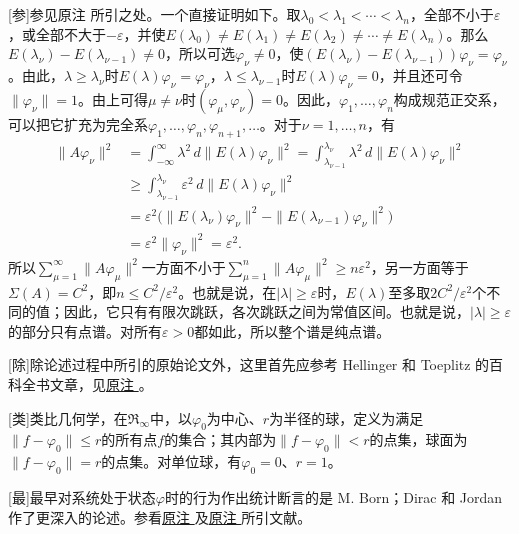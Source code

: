 \documentclass[fontsize=13pt,twoside,openany,headings=normal,parskip=false,bookmarkpackage=false,DIV=calc]{scrbook}
\begin{document}
[参]{参见原注 \hyperlink{note-64}{} 所引之处。一个直接证明如下。取$\lambda_0<\lambda_1<\cdots<\lambda_n$，全部不小于$\varepsilon$，或全部不大于$-\varepsilon$，并使$E(\lambda_0)\ne E(\lambda_1)\ne E(\lambda_2)\ne\cdots\ne E(\lambda_n)$。那么$E(\lambda_\nu)-E(\lambda_{\nu-1})\ne0$，所以可选$\varphi_\nu\ne0$，使$(E(\lambda_\nu)-E(\lambda_{\nu-1}))\varphi_\nu=\varphi_\nu$。由此，$\lambda\ge\lambda_\nu$时$E(\lambda)\varphi_\nu=\varphi_\nu$，$\lambda\le\lambda_{\nu-1}$时$E(\lambda)\varphi_\nu=0$，并且还可令$\|\varphi_\nu\|=1$。由上可得$\mu\ne\nu$时$(\varphi_\mu,\allowbreak \varphi_\nu)=0$。因此，$\varphi_1,\allowbreak \ldots,\allowbreak \varphi_n$构成规范正交系，可以把它扩充为完全系$\varphi_1,\allowbreak \ldots,\allowbreak \varphi_n,\allowbreak \varphi_{n+1},\allowbreak \ldots$。对于$\nu=1,\allowbreak \ldots,\allowbreak n$，有
\begin{align*}
\|A\varphi_\nu\|^2
&=\int_{-\infty}^{\infty}\lambda^2\,d\|E(\lambda)\varphi_\nu\|^2
=\int_{\lambda_{\nu-1}}^{\lambda_\nu}\lambda^2\,d\|E(\lambda)\varphi_\nu\|^2\\
&\ge\int_{\lambda_{\nu-1}}^{\lambda_\nu}\varepsilon^2\,d\|E(\lambda)\varphi_\nu\|^2\\
&=\varepsilon^2\bigl(\|E(\lambda_\nu)\varphi_\nu\|^2-\|E(\lambda_{\nu-1})\varphi_\nu\|^2\bigr)\\
&=\varepsilon^2\|\varphi_\nu\|^2=\varepsilon^2.
\end{align*}
所以$\sum_{\mu=1}^{\infty}\|A\varphi_\mu\|^2$一方面不小于$\sum_{\mu=1}^n\|A\varphi_\mu\|^2\ge n\varepsilon^2$，另一方面等于$\Sigma(A)=C^2$，即$n\le C^2/\varepsilon^2$。也就是说，在$|\lambda|\ge\varepsilon$时，$E(\lambda)$至多取$2C^2/\varepsilon^2$个不同的值；因此，它只有有限次跳跃，各次跳跃之间为常值区间。\hypertarget{origpage-250}{}\label{origpage-250}也就是说，$|\lambda|\ge\varepsilon$的部分只有点谱。对所有$\varepsilon>0$都如此，所以整个谱是纯点谱。}

[除]{除论述过程中所引的原始论文外，这里首先应参考 Hellinger 和 Toeplitz 的百科全书文章，见\CJKglue \hyperlink{note-33}{原注 }。}

[类]{类比几何学，在$\mathfrak R_\infty$中，以$\varphi_0$为中心、$r$为半径的球，定义为满足$\|f-\varphi_0\|\le r$的所有点$f$的集合；其内部为$\|f-\varphi_0\|<r$的点集，球面为$\|f-\varphi_0\|=r$的点集。对单位球，有$\varphi_0=0$、$r=1$。}

[最]{最早对系统处于状态$\varphi$时的行为作出统计断言的是 M. Born；Dirac 和 Jordan 作了更深入的论述。参看\CJKglue \hyperlink{note-8}{原注 } 及\CJKglue \hyperlink{note-2}{原注 } 所引文献。}
\end{document}
